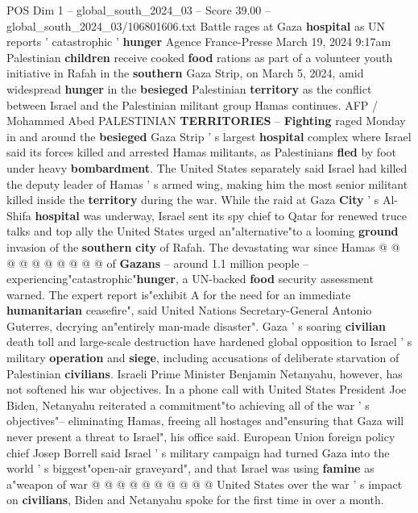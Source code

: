 \begin{textsample}{POS Dim 1 – global\_south\_2024\_03 – Score 39.00 – global\_south\_2024\_03/106801606.txt}  \label{ex:f1_pos_002}
Battle rages at Gaza \textbf{hospital} as UN reports ' catastrophic ' \textbf{hunger} Agence France-Presse March 19, 2024 9:17am Palestinian \textbf{children} receive cooked \textbf{food} rations as part of a volunteer youth initiative in Rafah in the \textbf{southern} Gaza Strip, on March 5, 2024, amid widespread \textbf{hunger} in the \textbf{besieged} Palestinian \textbf{territory} as the conflict between Israel and the Palestinian militant group Hamas continues.
AFP / Mohammed Abed PALESTINIAN \textbf{TERRITORIES} -- \textbf{Fighting} raged Monday in and around the \textbf{besieged} Gaza Strip ' s largest \textbf{hospital} complex where Israel said its forces killed and arrested Hamas militants, as Palestinians \textbf{fled} by foot under heavy \textbf{bombardment}.
The United States separately said Israel had killed the deputy leader of Hamas ' s armed wing, making him the most senior militant killed inside the \textbf{territory} during the war.
While the raid at Gaza \textbf{City} ' s Al-Shifa \textbf{hospital} was underway, Israel sent its spy chief to Qatar for renewed truce talks and top ally the United States urged an"alternative"to a looming \textbf{ground} invasion of the \textbf{southern} \textbf{city} of Rafah.
The devastating war since Hamas @ @ @ @ @ @ @ @ @ @ of \textbf{Gazans} -- around 1.1 million people -- experiencing"catastrophic"\textbf{hunger}, a UN-backed \textbf{food} security assessment warned.
The expert report is"exhibit A for the need for an immediate \textbf{humanitarian} ceasefire", said United Nations Secretary-General Antonio Guterres, decrying an"entirely man-made disaster".
Gaza ' s soaring \textbf{civilian} death toll and large-scale destruction have hardened global opposition to Israel ' s military \textbf{operation} and \textbf{siege}, including accusations of deliberate starvation of Palestinian \textbf{civilians}.
Israeli Prime Minister Benjamin Netanyahu, however, has not softened his war objectives.
In a phone call with United States President Joe Biden, Netanyahu reiterated a commitment"to achieving all of the war ' s objectives"-- eliminating Hamas, freeing all hostages and"ensuring that Gaza will never present a threat to Israel", his office said.
European Union foreign policy chief Josep Borrell said Israel ' s military campaign had turned Gaza into the world ' s biggest"open-air graveyard", and that Israel was using \textbf{famine} as a"weapon of war @ @ @ @ @ @ @ @ @ @ United States over the war ' s impact on \textbf{civilians}, Biden and Netanyahu spoke for the first time in over a month.

\end{textsample}
